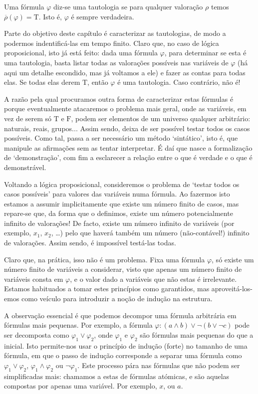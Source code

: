 \documentclass{report}
\theoremstyle{definition}
\theoremstyle{remark}
\newcommand{\lt}{\mathrm{T}}
\newcommand{\lf}{\mathrm{F}}
\begin{document}
	Uma fórmula $\varphi$ diz-se uma tautologia se para qualquer valoração $\rho$ temos $\overline\rho(\varphi) = \lt$. Isto é, $\varphi$ é sempre verdadeira.
	
	Parte do objetivo deste capítulo é caracterizar as tautologias, de modo a podermos indentificá-las em tempo finito. Claro que, no caso de lógica proposicional, isto já está feito: dada uma fórmula $\varphi$, para determinar se esta é uma tautologia, basta listar todas as valorações possíveis nas variáveis de $\varphi$ (há aqui um detalhe escondido, mas já voltamos a ele) e fazer as contas para todas elas. Se todas elas derem $\lt$, então $\varphi$ é uma tautologia. Caso contrário, não é!
	
	A razão pela qual procuramos outra forma de caracterizar estas fórmulas é porque eventualmente atacaremos o problema mais geral, onde as variáveis, em vez de serem só $\lt$ e $\lf$, podem ser elementos de um universo qualquer arbitrário: naturais, reais, grupos... Assim sendo, deixa de ser possível testar todos os casos possíveis. Como tal, passa a ser necessário um método `sintático', isto é, que manipule as afirmações sem as tentar interpretar. É daí que nasce a formalização de `demonstração', com fim a esclarecer a relação entre o que é verdade e o que é demonstrável.
	
	Voltando a lógica proposicional, consideremos o problema de `testar todos os casos possíveis' para valores das variáveis numa fórmula. Ao fazermos isto estamos a assumir implicitamente que existe um número finito de casos, mas repare-se que, da forma que o definimos, existe um número potencialmente infinito de valorações! De facto, existe um número infinito de variáveis (por exemplo, $x_1$, $x_2$, \dots) pelo que haverá também um número (não-contável!) infinito de valorações. Assim sendo, é impossível testá-las todas.
	
	Claro que, na prática, isso não é um problema. Fixa uma fórmula $\varphi$, só existe um número finito de variáveis a considerar, visto que apenas um número finito de variáveis consta em $\varphi$, e o valor dado a variáveis que não estas é irrelevante. Estamos habituados a tomar estes princípios como garantidos, mas aproveitá-los-emos como veículo para introduzir a noção de indução na estrutura.
	
	A observação essencial é que podemos decompor uma fórmula arbitrária em fórmulas mais pequenas. Por exemplo, a fórmula $\varphi : (a \land b) \lor \neg (b \lor \neg c)$ pode ser decomposta como $\varphi_1 \lor \varphi_2$, onde $\varphi_1$ e $\varphi_2$ são fórmulas mais pequenas do que a inicial. Isto permite-nos usar o princípio de indução (forte) no tamanho de uma fórmula, em que o passo de indução corresponde a separar uma fórmula como $\varphi_1 \lor \varphi_2$, $\varphi_1 \land \varphi_2$ ou $\neg \varphi_1$. Este processo pára nas fórmulas que não podem ser simplificadas mais: chamamos a estas de fórmulas atómicas, e são aquelas compostas por apenas uma variável. Por exemplo, $x$, ou $a$.
	
\end{document}
